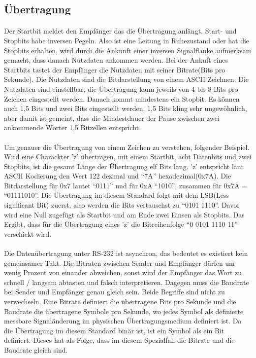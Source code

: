 \subsection{Übertragung}
\paragraph{}
Der Startbit meldet den Empfänger das die Übertragung anfängt. Start- und Stopbits habe inversen Pegeln. Also ist eine Leitung in Ruhezustand oder hat die Stopbits erhalten, wird durch die Ankunft einer inversen Signalflanke aufmerksam gemacht, dass danach Nutzdaten ankommen werden. Bei der Ankuft eines Startbits tastet der Empfänger die Nutzdaten mit seiner Bitrate(Bits pro Sekunde).  Die Nutzdaten sind die Bitdarstellung von einem ASCII Zeichnen. Die Nutzdaten sind einstellbar, die Übertragung kann jeweils von 4 bis 8 Bits pro Zeichen eingestellt werden. Danach kommt mindestens ein Stopbit. Es können auch 1,5 Bits und zwei Bits eingestellt werden. 1,5 Bits kling sehr ungewöhnlich, aber damit ist gemeint, dass die Mindestdauer der Pause zwischen zwei ankommende Wörter 1,5 Bitzellen entspricht. 

\paragraph{}
Um genauer die Übertragung von einem Zeichen zu verstehen, folgender Beispiel. Wird eine Charackter 'z' übertragen, mit einem Startbit, acht Datenbits und zwei Stopbits, ist die gesamt Länge der Übertragung elf Bits lang. 'z' entspricht laut ASCII Kodierung den Wert 122 dezimal und "`7A"' hexadezimal(0x7A). Die Bitdarstellung für 0x7 lautet "`0111"' und für 0xA "`1010"', zusammen für 0x7A = "`01111010"'. Die Übertragung im diesem Standard folgt mit dem LSB(Less significant Bit) zuerst, also werden die Bits vertauschst zu "`0101 1110"'. Davor wird eine Null zugefügt als Startbit und am Ende zwei Einsen als Stopbits. Das Ergibt, dass für die Übertragung eines 'z' die Bitreihenfolge "`0 0101 1110 11"' verschickt wird.

\paragraph{}
Die Datenübertragung unter RS-232 ist asynchron, das bedeutet es existiert kein gemeinsamer Takt. Die Bitraten zwischen Sender und Empfänger dürfen um wenig Prozent von einander abweichen, sonst wird der Empfänger das Wort zu schnell / langsam abtasten und falsch interpretieren. Dagegen muss die Baudrate bei Sender und Empfänger genau gleich sein. Beide Begriffe sind nicht zu verwechseln. Eine Bitrate definiert die übertragene Bits pro Sekunde und die Baudrate die übertragene Symbole pro Sekunde, wo jedes Symbol als definierte messbare Signaländerung im physischen Übertragungsmedium definiert ist. Da die Übertragung im diesem Standard binär ist, ist ein Symbol als ein Bit definiert. Dieses hat als Folge, dass im diesem Spezialfall die Bitrate und die Baudrate gleich sind.

